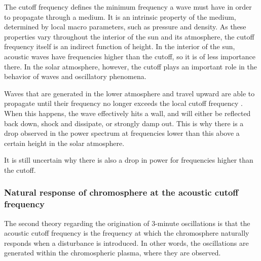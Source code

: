 The cutoff frequency defines the minimum frequency a wave must have in order to
propagate through a medium.
It is an intrinsic property of the medium,
determined by local macro parameters, such as pressure and density.
As these properties vary throughout the interior of the sun and its atmosphere,
the cutoff frequency itself is an indirect function of height.
In the interior of the sun, acoustic waves have frequencies higher than the
cutoff, so it is of less importance there. In the solar atmosphere, however,
the cutoff plays an important role in the behavior of waves and oscillatory
phenomena.

Waves that are generated in the lower atmosphere
and travel upward are able to propagate until
their frequency no longer exceeds the local cutoff frequency
\citep{DeMoortel2000, Brynildsen1999}.
When this happens, the wave effectively hits a wall, and will either be
reflected back down, shock and dissipate, or strongly damp out.
This is why there is a drop observed in the power spectrum at frequencies
lower than this above a certain height in the solar atmosphere.


It is still uncertain why there is also a drop in power for
frequencies higher than the cutoff.


\subsubsection{%
    Natural response of chromosphere at the acoustic cutoff frequency}

The second theory regarding the origination of 3-minute oscillations
is that the acoustic cutoff frequency is the frequency at which the
chromosphere naturally responds when a disturbance is introduced.
In other words, the oscillations are
generated within the chromospheric plasma, where they are observed.


